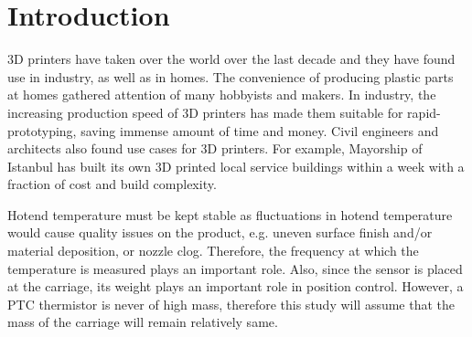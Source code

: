 \chapter*{Introduction}
\par
3D printers have taken over the world over the last decade and
they have
found use in industry, as well as in homes. The convenience of producing
plastic parts at homes gathered attention of many hobbyists and makers. In
industry, the increasing production speed of 3D printers has made
them suitable for rapid-prototyping, saving immense amount of time and
money. Civil engineers and architects also found use
cases for 3D printers. For example, Mayorship of Istanbul has built its own
3D printed
local service buildings within a week with a fraction of cost and build
complexity.

Hotend temperature must be kept stable as fluctuations in hotend
temperature would cause quality issues on the product, e.g. uneven surface
finish and/or material deposition, or nozzle clog. Therefore, the frequency
at which the temperature is measured plays an important role. Also, since
the sensor is placed at the carriage, its weight plays an important role in
position control. However, a PTC thermistor is never of high mass,
therefore this study will assume that the mass of the carriage will remain
relatively same.